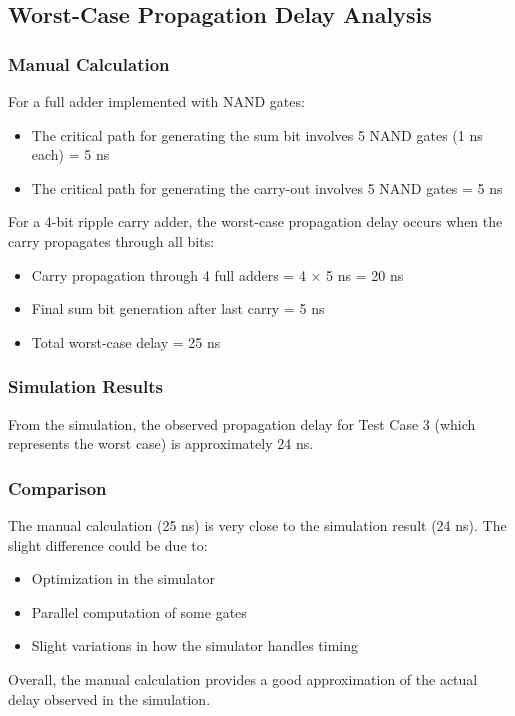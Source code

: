\documentclass{article}
\begin{document}
\subsection{Worst-Case Propagation Delay Analysis}

\subsubsection{Manual Calculation}
For a full adder implemented with NAND gates:
\begin{itemize}
	\item The critical path for generating the sum bit involves 5 NAND gates (1 ns each) = 5 ns
	\item The critical path for generating the carry-out involves 5 NAND gates = 5 ns
\end{itemize}

For a 4-bit ripple carry adder, the worst-case propagation delay occurs when the carry propagates through all bits:
\begin{itemize}
	\item Carry propagation through 4 full adders = 4 × 5 ns = 20 ns
	\item Final sum bit generation after last carry = 5 ns
	\item Total worst-case delay = 25 ns
\end{itemize}

\subsubsection{Simulation Results}
From the simulation, the observed propagation delay for Test Case 3 (which represents the worst case) is approximately 24 ns.

\subsubsection{Comparison}
The manual calculation (25 ns) is very close to the simulation result (24 ns). The slight difference could be due to:
\begin{itemize}
	\item Optimization in the simulator
	\item Parallel computation of some gates
	\item Slight variations in how the simulator handles timing
\end{itemize}

Overall, the manual calculation provides a good approximation of the actual delay observed in the simulation.
\end{document}
